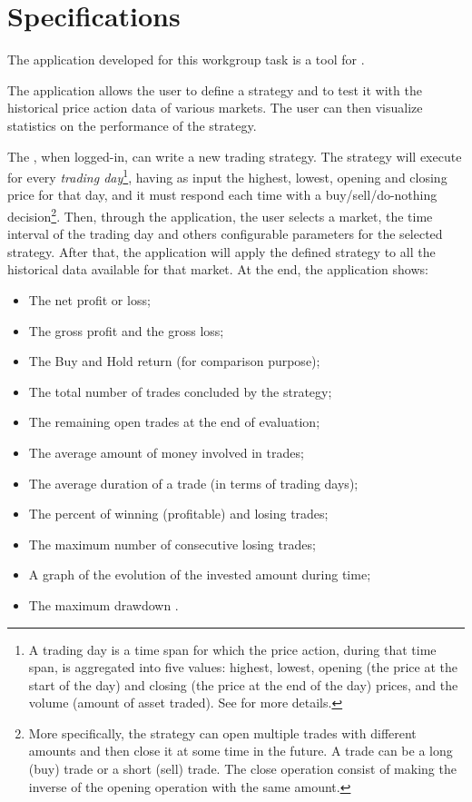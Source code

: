 \chapter{Specifications}\label{ch:specs}

The application developed for this workgroup task is a tool for
.

The application allows the user to define a strategy and to test it with the
historical price action data of various markets. The user can then visualize
statistics on the performance of the strategy.

The , when logged-in, can write a new trading strategy. The
strategy will execute for every \emph{trading day}\footnote{A trading day is a
time span for which the price action, during that time span, is aggregated into
five values: highest, lowest, opening (the price at the start of the day) and
closing (the price at the end of the day) prices, and the volume (amount of
asset traded). See  for more details.}, having as
input the highest, lowest, opening and closing price for that day, and it must
respond each time with a buy/sell/do-nothing decision\footnote{More
specifically, the strategy can open multiple trades with different amounts and
then close it at some time in the future. A trade can be a long (buy) trade or a
short (sell) trade. The close operation consist of making the inverse of the
opening operation with the same amount.}. Then, through the application, the
user selects a market, the time interval of the trading day and others
configurable parameters for the selected strategy. After that, the application
will apply the defined strategy to all the historical data available for that
market. At the end, the application shows:
\begin{itemize}
	\item The net profit or loss;
	\item The gross profit  and the gross loss;
	\item The Buy and Hold return (for comparison purpose);
	\item The total number of trades concluded by the strategy;
	\item The remaining open trades at the end of evaluation;
	\item The average amount of money involved in trades;
	\item The average duration of a trade (in terms of trading days);
	\item The percent of winning (profitable) and losing trades;
	\item The maximum number of consecutive losing trades;
	\item A graph of the evolution of the invested amount during time;
	\item The maximum drawdown .
\end{itemize}

